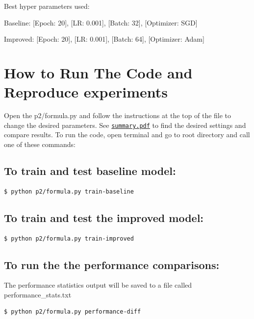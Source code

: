 \documentclass{article}
\begin{document}
Best hyper parameters used:

Baseline: [Epoch: 20], [LR: 0.001], [Batch: 32], [Optimizer: SGD]

Improved: [Epoch: 20], [LR: 0.001], [Batch: 64], [Optimizer: Adam]





\section{How to Run The Code and Reproduce experiments}
Open the p2/formula.py and follow the instructions at the top of the file to change the desired parameters. See \href{run:https://git.cs.usask.ca/matcrunch/cmpt-423-820-w25-p2/-/blob/solution/summary.pdf?ref_type=heads}{\texttt{summary.pdf}} to find the desired settings and compare results. To run the code, open terminal and go to root directory and call one of these commands:

\subsection{To train and test baseline model:}

\begin{verbatim}
$ python p2/formula.py train-baseline
\end{verbatim}
\subsection{To train and test the improved model:}
\begin{verbatim}
$ python p2/formula.py train-improved
\end{verbatim}
\subsection{To run the the performance comparisons:}
The performance statistics output will be saved to a file called performance\_stats.txt
\begin{verbatim}
$ python p2/formula.py performance-diff
\end{verbatim}
\end{document}
